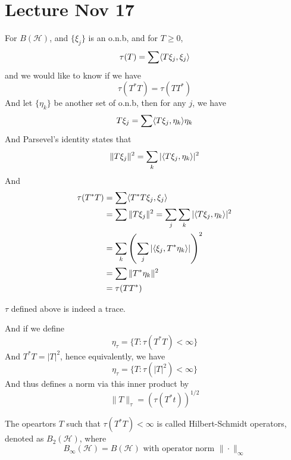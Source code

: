 \section{Lecture Nov 17}
For $B(\mathcal{H})$, and $\{\xi_j\}$ is an o.n.b, and for $T\geq 0$, 
\begin{equation*}
    \tau(T)=\sum\langle T\xi_j,\xi_j\rangle
\end{equation*}
and we would like to know if we have 
\begin{equation*}
    \tau(T^*T)=\tau(TT^*)
\end{equation*}
And let $\{\eta_k\}$ be another set of o.n.b, then for any $j$, we have 
\begin{equation*}
    T\xi_j=\sum\langle T\xi_j, \eta_k\rangle\eta_k
\end{equation*}
And Parsevel's identity states that 
\begin{equation*}
    \|T\xi_j\|^2=\sum_k|\langle T\xi_j, \eta_k\rangle|^2
\end{equation*}
And 
\begin{align*}
    \tau(T^*T)&=\sum\langle T^*T\xi_j, \xi_j\rangle\\
    &=\sum\|T\xi_j\|^2=\sum_j\sum_k|\langle T\xi_j, \eta_k\rangle|^2\\
    &= \sum_k\left(\sum_j|\langle\xi_j, T^*\eta_k\rangle|\right)^2\\
    &=\sum\|T^*\eta_k\|^2\\
    &=\tau(TT^*)
\end{align*}
\begin{corollary}
    $\tau$ defined above is indeed a trace.
\end{corollary}
And if we define 
\begin{equation*}
    \eta_\tau=\{T: \tau(T^*T)<\infty\} 
\end{equation*}
And $T^*T=|T|^2$, hence equivalently, we have
\begin{equation*}
    \eta_\tau=\{T: \tau(|T|^2)<\infty\}
\end{equation*}
And thus defines a norm via this inner product by 
\begin{equation*}
    \|T\|_\tau=\left(\tau(T^*t)\right)^{1/2}
\end{equation*}

\begin{definition}
    The opeartors $T$ such that $\tau(T^*T)<\infty$ is called Hilbert-Schmidt operators, denoted as $B_2(\mathcal{H})$, where 
    \begin{equation*}
        B_\infty(\mathcal{H})=B(\mathcal{H}) \text{ with  operator norm } \|\cdot\|_\infty
    \end{equation*}
\end{definition}

